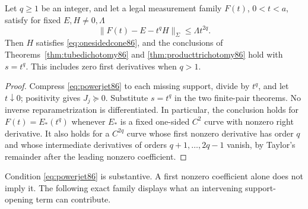 \begin{corollary}
\label{cor:powerjets86}
Let $q\ge1$ be an integer, and let a legal measurement family $F(t)$,
$0<t<a$, satisfy for fixed $E,H\ne0,\Lambda$
\begin{equation}\label{eq:powerjet86}
 \|F(t)-E-t^qH\|_{\Sigma}\le\Lambda t^{2q}.
\end{equation}
Then $H$ satisfies \eqref{eq:onesidedcone86}, and the conclusions of
Theorems~\ref{thm:tubedichotomy86} and
\ref{thm:producttrichotomy86} hold with $s=t^q$.
This includes zero first derivatives when $q>1$.
\end{corollary}
\begin{proof}
Compress \eqref{eq:powerjet86} to each missing support, divide by
$t^q$, and let $t\downarrow0$; positivity gives $J_j\succeq0$.
Substitute $s=t^q$ in the two finite-pair theorems.  No inverse
reparametrization is differentiated.  In particular, the conclusion
holds for $F(t)=E_*(t^q)$ whenever $E_*$ is a fixed one-sided $C^2$
curve with nonzero right derivative.  It also holds for a $C^{2q}$
curve whose first nonzero derivative has order $q$ and whose
intermediate derivatives of orders $q+1,\ldots,2q-1$ vanish, by Taylor's remainder after the leading nonzero coefficient.
\end{proof}

Condition \eqref{eq:powerjet86} is substantive.  A first nonzero
coefficient alone does not imply it.  The following exact family
displays what an intervening support-opening term can contribute.

